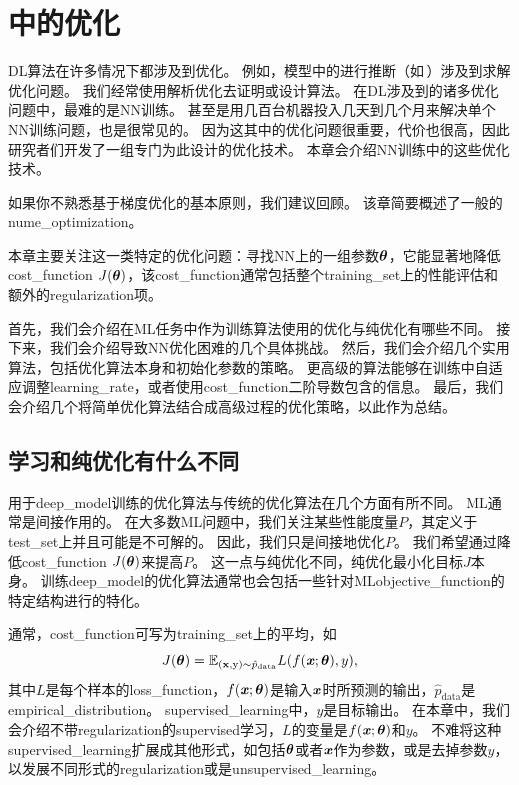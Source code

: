 \chapter{中的优化}
\label{chap:optimization_for_training_deep_models}
\gls{DL}算法在许多情况下都涉及到优化。
例如，模型中的进行推断（如\,）涉及到求解优化问题。
我们经常使用解析优化去证明或设计算法。
在\gls{DL}涉及到的诸多优化问题中，最难的是\gls{NN}训练。
甚至是用几百台机器投入几天到几个月来解决单个\gls{NN}训练问题，也是很常见的。
因为这其中的优化问题很重要，代价也很高，因此研究者们开发了一组专门为此设计的优化技术。
本章会介绍\gls{NN}训练中的这些优化技术。

如果你不熟悉基于梯度优化的基本原则，我们建议回顾。
该章简要概述了一般的\gls{nume_optimization}。


本章主要关注这一类特定的优化问题：寻找\gls{NN}上的一组参数$\boldsymbol{\theta}$，它能显著地降低\gls{cost_function} $J(\boldsymbol{\theta})$，该\gls{cost_function}通常包括整个\gls{training_set}上的性能评估和额外的\gls{regularization}项。


首先，我们会介绍在\gls{ML}任务中作为训练算法使用的优化与纯优化有哪些不同。
接下来，我们会介绍导致\gls{NN}优化困难的几个具体挑战。
然后，我们会介绍几个实用算法，包括优化算法本身和初始化参数的策略。
更高级的算法能够在训练中自适应调整\gls{learning_rate}，或者使用\gls{cost_function}二阶导数包含的信息。
最后，我们会介绍几个将简单优化算法结合成高级过程的优化策略，以此作为总结。


\section{学习和纯优化有什么不同}
\label{sec:how_learning_differs_from_pure_optimization}
用于\gls{deep_model}训练的优化算法与传统的优化算法在几个方面有所不同。
\gls{ML}通常是间接作用的。
在大多数\gls{ML}问题中，我们关注某些性能度量$P$，其定义于\gls{test_set}上并且可能是不可解的。
因此，我们只是间接地优化$P$。
我们希望通过降低\gls{cost_function} $J(\boldsymbol{\theta})$来提高$P$。
这一点与纯优化不同，纯优化最小化目标$J$本身。
训练\gls{deep_model}的优化算法通常也会包括一些针对\gls{ML}\gls{objective_function}的特定结构进行的特化。


通常，\gls{cost_function}可写为\gls{training_set}上的平均，如
\begin{equation}
\label{eq:8.1}
    J(\Vtheta) = \SetE_{(\RVx, \RSy) \sim\hat{p}_\text{data}} L(f(\Vx ; \Vtheta), y), %
\end{equation}
其中$L$是每个样本的\gls{loss_function}，$f(\boldsymbol{\mathit{x}};\boldsymbol{\theta})$是输入$\boldsymbol{\mathit{x}}$时所预测的输出，$\hat{p}_{\text{data}}$是\gls{empirical_distribution}。
\gls{supervised_learning}中，$y$是目标输出。
在本章中，我们会介绍不带\gls{regularization}的\gls{supervised}学习，$L$的变量是$f(\boldsymbol{\mathit{x}};\boldsymbol{\theta})$和$y$。
不难将这种\gls{supervised_learning}扩展成其他形式，如包括$\boldsymbol{\theta}$或者$\boldsymbol{\mathit{x}}$作为参数，或是去掉参数$y$，以发展不同形式的\gls{regularization}或是\gls{unsupervised_learning}。



